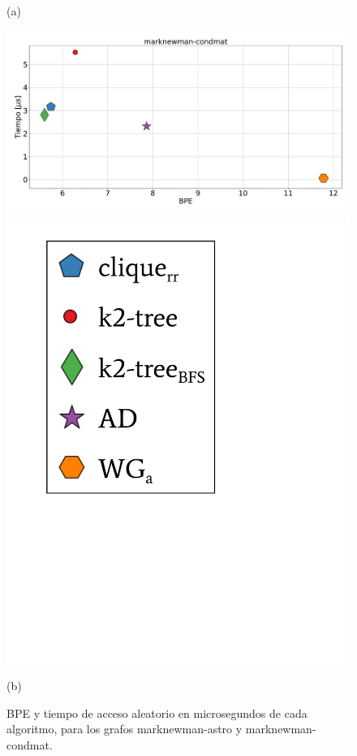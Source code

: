 \begin{figure}
\begin{minipage}{1\textwidth}
    			(a)		
    	\end{minipage}
    	
       	\begin{minipage}{1\textwidth}
    			\centering
    			\begin{minipage}{0.8\textwidth}
    				\centering
    				\includegraphics[width=1\linewidth]{img/bpeTimes/aleatorio/marknewman-condmat.pdf}
    			\end{minipage}
    			\begin{minipage}{0.15\textwidth}
    				\centering
    				\includegraphics[scale=.24, clip, trim=70 300 230 30]{img/bpeTimes/labelAle.pdf}
    			\end{minipage}
    			
    			(b)		
    	\end{minipage}
    	
    \caption{BPE y tiempo de acceso aleatorio en microsegundos de cada algoritmo, para los grafos marknewman-astro y marknewman-condmat.}
    \label{fig:bpetAle}
\end{figure}
